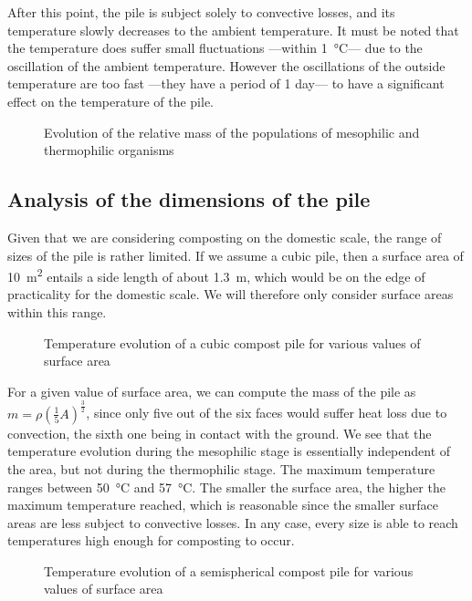 \documentclass[12pt, a4paper, twocolumn, twoside]{article}
\numberwithin{table}{section}
\numberwithin{figure}{section}
\numberwithin{equation}{section}
\begin{document}
After this point, the pile is subject solely to convective losses, and its temperature slowly decreases to the ambient temperature. It must be noted that the temperature does suffer small fluctuations ---within \SI{1}{\celsius}--- due to the oscillation of the ambient temperature. However the oscillations of the outside temperature are too fast ---they have a period of 1 day--- to have a significant effect on the temperature of the pile.  

\begin{figure}[htb]
	\sffamily \footnotesize \centering
	
	\caption{Evolution of the relative mass of the populations of mesophilic and thermophilic organisms}
	\label{fig:poblacions}
\end{figure}

\subsection{Analysis of the dimensions of the pile}
Given that we are considering composting on the domestic scale, the range of sizes of the pile is rather limited. If we assume a cubic pile, then a surface area of \SI{10}{m^2}	entails a side length of about \SI{1.3}{m}, which would be on the edge of practicality for the domestic scale. We will therefore only consider surface areas within this range. 

\begin{figure}[htb]
	\sffamily \footnotesize \centering
	
	\caption{Temperature evolution of a cubic compost pile for various values of surface area}
	\label{fig:temp-arees}
\end{figure}

For a given value of surface area, we can compute the mass of the pile as \( m = \rho\left(\frac{1}{5}A\right)^{\frac{3}{2}} \), since only five out of the six faces would suffer heat loss due to convection, the sixth one being in contact with the ground. We see that the temperature evolution during the mesophilic stage is essentially independent of the area, but not during the thermophilic stage. The maximum temperature ranges between \SI{50}{\celsius} and \SI{57}{\celsius}. The smaller the surface area, the higher the maximum temperature reached, which is reasonable since the smaller surface areas are less subject to convective losses. In any case, every size is able to reach temperatures high enough for composting to occur.  

\begin{figure}[htb]
	\sffamily \footnotesize \centering
	
	\caption{Temperature evolution of a semispherical compost pile for various values of surface area}
	\label{fig:temp-semiesferes}
\end{figure}
\end{document}
